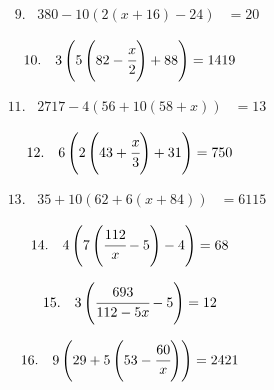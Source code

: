 \documentclass{article}
\begin{document}
\noindent
\begin{minipage}[t]{0.5000\textwidth}
\begin{align*}
9.\hspace{10pt}380-10\left(2\left(x+16\right)-24\right)&=20
\end{align*}
\end{minipage}
\begin{minipage}[t]{0.5000\textwidth}
\begin{align*}
10.\hspace{10pt}3\left(5\left(82-\cfrac{x}{2}\right)+88\right)&=1419
\end{align*}
\end{minipage}
\vspace{10 mm}

\noindent
\begin{minipage}[t]{0.5000\textwidth}
\begin{align*}
11.\hspace{10pt}2717-4\left(56+10\left(58+x\right)\right)&=13
\end{align*}
\end{minipage}
\begin{minipage}[t]{0.5000\textwidth}
\begin{align*}
12.\hspace{10pt}6\left(2\left(43+\cfrac{x}{3}\right)+31\right)&=750
\end{align*}
\end{minipage}
\vspace{10 mm}

\noindent
\begin{minipage}[t]{0.5000\textwidth}
\begin{align*}
13.\hspace{10pt}35+10\left(62+6\left(x+84\right)\right)&=6115
\end{align*}
\end{minipage}
\begin{minipage}[t]{0.5000\textwidth}
\begin{align*}
14.\hspace{10pt}4\left(7\left(\cfrac{112}{x}-5\right)-4\right)&=68
\end{align*}
\end{minipage}
\vspace{10 mm}

\noindent
\begin{minipage}[t]{0.5000\textwidth}
\begin{align*}
15.\hspace{10pt}3\left(\cfrac{693}{112-5x}-5\right)&=12
\end{align*}
\end{minipage}
\begin{minipage}[t]{0.5000\textwidth}
\begin{align*}
16.\hspace{10pt}9\left(29+5\left(53-\cfrac{60}{x}\right)\right)&=2421
\end{align*}
\end{minipage}
\vspace{10 mm}
\end{document}
